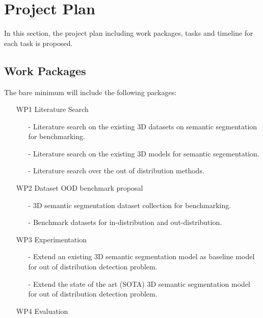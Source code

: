 \documentclass[thesis]{mas_proposal}
\begin{document}
\section{Project Plan}
In this section, the project plan including work packages, tasks and timeline for each task is proposed.
\subsection{Work Packages}
The bare minimum will include the following packages:
\begin{enumerate}
    \item[WP1] Literature Search
    \begin{itemize}
        \item[-] Literature search on the existing 3D datasets on semantic segmentation for benchmarking.
        \item[-] Literature search on the existing  3D models for semantic segementation.
        \item[-] Literature search over the out of distribution methods.
    \end{itemize} 
    \item[WP2] Dataset OOD benchmark proposal
    \begin{itemize}
        \item[-] 3D semantic segmentation dataset collection for benchmarking.
        \item[-] Benchmark datasets for in-distribution and out-distribution.
    \end{itemize}
    \item[WP3] Experimentation
    \begin{itemize}
        \item[-] Extend an existing 3D semantic segmentation model as baseline model for out of distribution detection problem.
        \item[-] Extend the state of the art (SOTA) 3D semantic segmentation model for out of distribution detection problem.
    \end{itemize}
    \item[WP4] Evaluation
    \begin{itemize}

\end{itemize}
\end{enumerate}
\end{document}
